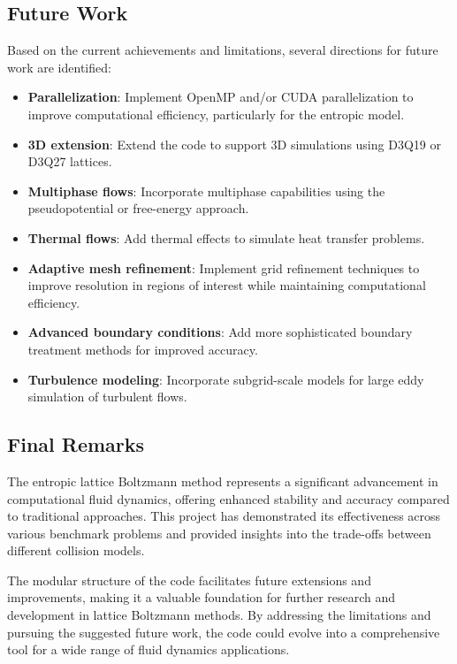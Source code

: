 \documentclass[12pt,a4paper]{article}
\begin{document}
\subsection{Future Work}
Based on the current achievements and limitations, several directions for future work are identified:

\begin{itemize}
    \item \textbf{Parallelization}: Implement OpenMP and/or CUDA parallelization to improve computational efficiency, particularly for the entropic model.
    \item \textbf{3D extension}: Extend the code to support 3D simulations using D3Q19 or D3Q27 lattices.
    \item \textbf{Multiphase flows}: Incorporate multiphase capabilities using the pseudopotential or free-energy approach.
    \item \textbf{Thermal flows}: Add thermal effects to simulate heat transfer problems.
    \item \textbf{Adaptive mesh refinement}: Implement grid refinement techniques to improve resolution in regions of interest while maintaining computational efficiency.
    \item \textbf{Advanced boundary conditions}: Add more sophisticated boundary treatment methods for improved accuracy.
    \item \textbf{Turbulence modeling}: Incorporate subgrid-scale models for large eddy simulation of turbulent flows.
\end{itemize}

\subsection{Final Remarks}
The entropic lattice Boltzmann method represents a significant advancement in computational fluid dynamics, offering enhanced stability and accuracy compared to traditional approaches. This project has demonstrated its effectiveness across various benchmark problems and provided insights into the trade-offs between different collision models.

The modular structure of the code facilitates future extensions and improvements, making it a valuable foundation for further research and development in lattice Boltzmann methods. By addressing the limitations and pursuing the suggested future work, the code could evolve into a comprehensive tool for a wide range of fluid dynamics applications.
\end{document}
